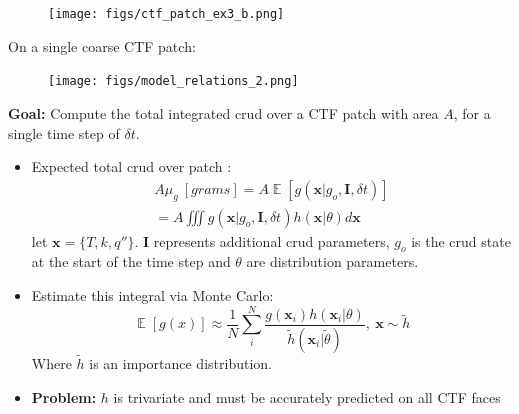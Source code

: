 \documentclass[t, pdftex]{beamer}
\DeclareMathOperator*{\E}{\mathbb{E}}
\begin{document}
\begin{frame}
\begin{figure}[!htbp]
\centering
\texttt{[image: figs/ctf\_patch\_ex3\_b.png]}
\label{model_overview}
\end{figure}
\end{frame}

\begin{frame}
On a single coarse CTF patch:
\begin{figure}[!htbp]
\centering
\texttt{[image: figs/model\_relations\_2.png]}
\label{model_overview}
\end{figure}
\end{frame}

\begin{frame}
\textbf{Goal:} Compute the total integrated crud over a CTF patch with area $A$, for a single time step of $\delta t$.
\begin{itemize}
	\item Expected total crud over patch : 
	\begin{eqnarray}
		A \mu_g\ [grams] = A \E[g(\mathbf x|g_o, \mathbf I, \delta t)] \nonumber \\
		= A \iiint g(\mathbf x|g_o, \mathbf I, \delta t) h(\mathbf x|\theta) d \mathbf x  \nonumber
	\end{eqnarray}
	let $\mathbf x= \{T, k, q''\}$.
	$\mathbf I$ represents additional crud parameters, $g_o$ is the crud state at the start of the time step and $\theta$ are distribution parameters.
	\item Estimate this integral via Monte Carlo:
	\[
	\E[g(x)] \approx \frac{1}{N} \sum_i^N \frac{g(\mathbf x_i) 
	h(\mathbf x_i | \theta)}{\tilde h(\mathbf x_i | \tilde \theta)}, \ \mathbf x \sim \tilde h
	\]
	Where $\tilde h$ is an importance distribution. 
    \item \textbf{Problem:} $h$ is trivariate and must be accurately predicted on all CTF faces
\end{itemize}
\end{frame}


\end{document}
